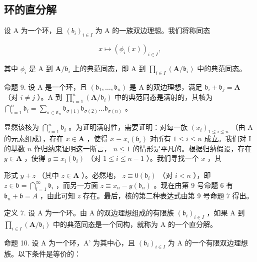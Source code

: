 \subsection{环的直分解}

设 A 为一个环，且 \((b_{i})_{i\in I}\) 为 A 的一族双边理想。我们将称同态

\[
x \mapsto (\phi_ {i} (x)) _ {i \in I},
\]

其中 \(\phi_{i}\) 是 A 到 \(\mathbf{A} / \mathfrak{b}_i\) 上的典范同态，即 A 到 \(\prod_{i\in I}(\mathbf{A} / \mathfrak{b}_i)\) 中的典范同态。

命题 9. 设 A 是一个环，且 \((\mathfrak{b}_1, \ldots, \mathfrak{b}_n)\) 是 A 的双边理想，满足 \(\mathfrak{b}_i + \mathfrak{b}_j = \mathbf{A}\) （对 \(i \neq j\) ）。A 到 \(\prod_{i=1}^{n} (\mathbf{A} / \mathfrak{b}_i)\) 中的典范同态是满射的，其核为 \(\bigcap_{i=1}^{n} \mathfrak{b}_i = \sum_{\sigma \in \mathfrak{E}_n} \mathfrak{b}_{\sigma(1)} \mathfrak{b}_{\sigma(2)} \ldots \mathfrak{b}_{\sigma(n)}\) 。

显然该核为 \(\bigcap_{i=1}^{n} \mathfrak{b}_i\) 。为证明满射性，需要证明：对每一族 \((x_i)_{1 \leqslant i \leqslant n}\) （由 A 的元素组成），存在 \(x \in \mathbf{A}\) ，使得 \(x \equiv x_i (\mathfrak{b}_i)\) 对所有 \(1 \leqslant i \leqslant n\) 成立。我们对 I 的基数 \(n\) 作归纳来证明这一断言， \(n \leqslant 1\) 的情形是平凡的。根据归纳假设，存在 \(y \in \mathbf{A}\) ，使得 \(y \equiv x_i (\mathfrak{b}_i)\) （对 \(1 \leqslant i \leqslant n-1\) ）。我们寻找一个 \(x\) ，其

形式 \(y + z\) （其中 \(z \in \mathbf{A}\) ）。必然地， \(z \equiv 0(\mathfrak{b}_i)\) （对 \(i < n\) ），即 \(z \in \mathfrak{b} = \bigcap_{i=1}^{\infty} \mathfrak{b}_i\) ，而另一方面 \(z \equiv x_n - y(\mathfrak{b}_n)\) 。现在由第 9 号命题 6 有 \(\mathfrak{b}_n + \mathfrak{b} = A\) ，由此可知 \(z\) 存在。最后，核的第二种表达式由第 9 号命题 7 得出。

定义 7. 设 A 为一个环。由 A 的双边理想组成的有限族 \((\mathfrak{b}_i)_{i\in I}\) ，如果 A 到 \(\prod_{i\in I}(\mathbf{A} / \mathfrak{b}_i)\) 中的典范同态是一个同构，就称为 A 的一个直分解。

命题 10. 设 A 为一个环，A' 为其中心，且 \((\mathfrak{b}_{i})_{i\in I}\) 为 A 的一个有限双边理想族。以下条件是等价的：

